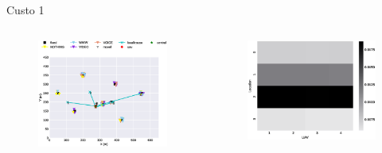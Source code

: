 \begin{frame}{Custo 1}
        \begin{columns}
            \begin{column}{0.65\textwidth}
               \begin{figure}[!htb]
                    \includegraphics[width=\textwidth]{custo_1/0_uav_loc.eps}
                \end{figure}
            \end{column}
            \begin{column}{0.45\textwidth}
               \begin{figure}[!htb]
                    \includegraphics[width=\textwidth]{custo_1/0_bij_.eps}

\end{figure}
\end{column}
\end{columns}
\end{frame}
